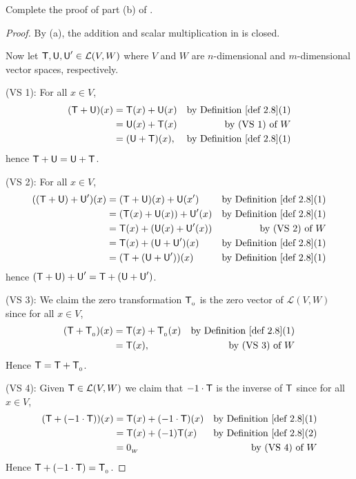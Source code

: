 \begin{exercise} \label{exercise 2.2.6}
Complete the proof of part (b) of .
\end{exercise}

\begin{proof}
By (a), the addition and scalar multiplication in  is closed.

Now let \(\textsf{T}, \textsf{U}, \textsf{U}' \in \mathcal{L}(V, W)\) where \(V\) and \(W\) are \(n\)-dimensional and \(m\)-dimensional vector spaces, respectively.

(VS 1): For all \(x \in V\),
\begin{align*}
    (\T + \U)(x) & = \T(x) + \U(x) & \text{by \DEF{2.8}(1)} \\
                 & = \U(x) + \T(x) & \text{by (VS 1) of \(W\)} \\
                 & = (\U + \T)(x), & \text{by \DEF{2.8}(1)}
\end{align*}
hence \(\textsf{T} + \textsf{U} = \textsf{U} + \textsf{T}\).

(VS 2): For all \(x \in V\),
\begin{align*}
    ((\T + \U) + \U')(x) & = (\T + \U)(x) + \U(x') & \text{by \DEF{2.8}(1)} \\
                         & = (\T(x) + \U(x)) + \U'(x) & \text{by \DEF{2.8}(1)} \\
                         & = \T(x) + (\U(x) + \U'(x)) & \text{by (VS 2) of \(W\)} \\
                         & = \T(x) + (\U +\U')(x) & \text{by \DEF{2.8}(1)} \\
                         & = (\T + (\U +\U'))(x) & \text{by \DEF{2.8}(1)}
\end{align*}
hence \((\textsf{T} + \textsf{U}) + \textsf{U}' = \textsf{T} + (\textsf{U} + \textsf{U}')\).

(VS 3): We claim the zero transformation \(\textsf{T}_{_0}\) is the zero vector of \(\mathcal{L}(V, W)\) since for all \(x \in V\),
\begin{align*}
    (\T + \TZERO)(x) & = \T(x) + \TZERO(x) & \text{by \DEF{2.8}(1)} \\
                     & = \T(x), & \text{by (VS 3) of \(W\)}
\end{align*}
Hence \(\textsf{T} = \textsf{T} + \textsf{T}_{_0}\).

(VS 4): Given \(\textsf{T} \in \mathcal{L}(V, W)\) we claim that \(-1 \cdot \textsf{T}\) is the inverse of \(\textsf{T}\) since for all \(x \in V\),
\begin{align*}
    (\T + (-1 \cdot \T))(x) & = \T(x) + (-1 \cdot \T)(x) & \text{by \DEF{2.8}(1)} \\
                            & = \T(x) + (-1)\T(x) & \text{by \DEF{2.8}(2)} \\
                            & = \OW & \text{by (VS 4) of \(W\)}
\end{align*}
Hence \(\textsf{T} + (-1 \cdot \textsf{T}) = \textsf{T}_{_0}\).


\end{proof}
